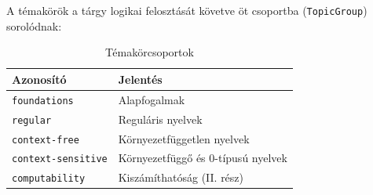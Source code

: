 \documentclass[12pt,a4paper]{report}
\begin{document}
A témakörök a tárgy logikai felosztását követve öt csoportba
(\texttt{TopicGroup}) sorolódnak:

\begin{table}[htbp]
    \centering
    \begin{tabular}{ll}
        \toprule
        \textbf{Azonosító} & \textbf{Jelentés} \\
        \midrule
        \texttt{foundations}       & Alapfogalmak \\
        \texttt{regular}           & Reguláris nyelvek \\
        \texttt{context-free}      & Környezetfüggetlen nyelvek \\
        \texttt{context-sensitive} & Környezetfüggő és 0-típusú nyelvek \\
        \texttt{computability}     & Kiszámíthatóság (II. rész) \\
        \bottomrule
    \end{tabular}
    \caption{Témakörcsoportok}
    \label{tab:groups}
\end{table}

\end{document}
